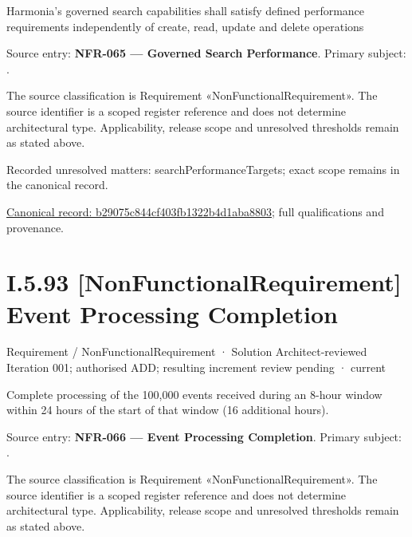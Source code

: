 Harmonia's governed search capabilities shall satisfy defined performance requirements independently of create, read, update and delete operations



Source entry: \textbf{NFR-065 — Governed Search Performance}. Primary subject: \texttt{}.



The source classification is Requirement «NonFunctionalRequirement». The source identifier is a scoped register reference and does not determine architectural type. Applicability, release scope and unresolved thresholds remain as stated above.


{\small Recorded unresolved matters: searchPerformanceTargets; exact scope remains in the canonical record.}\par
{\footnotesize \href{../../../../../../../continuum/motivation/requirement/non-functional-requirement/b29075c844cf403fb1322b4d1aba8803.md}{Canonical record: b29075c844cf403fb1322b4d1aba8803}; full qualifications and provenance.}\par
\section*{I.5.93 [NonFunctionalRequirement] Event Processing Completion}
\label{navigation:I.5.93}

\label{element:d1380eec700a492b810354e0798c8146}
{\small Requirement / NonFunctionalRequirement · Solution Architect-reviewed Iteration 001; authorised ADD; resulting increment review pending · current}\par

Complete processing of the 100,000 events received during an 8-hour window within 24 hours of the start of that window (16 additional hours).



Source entry: \textbf{NFR-066 — Event Processing Completion}. Primary subject: \texttt{}.



The source classification is Requirement «NonFunctionalRequirement». The source identifier is a scoped register reference and does not determine architectural type. Applicability, release scope and unresolved thresholds remain as stated above.


